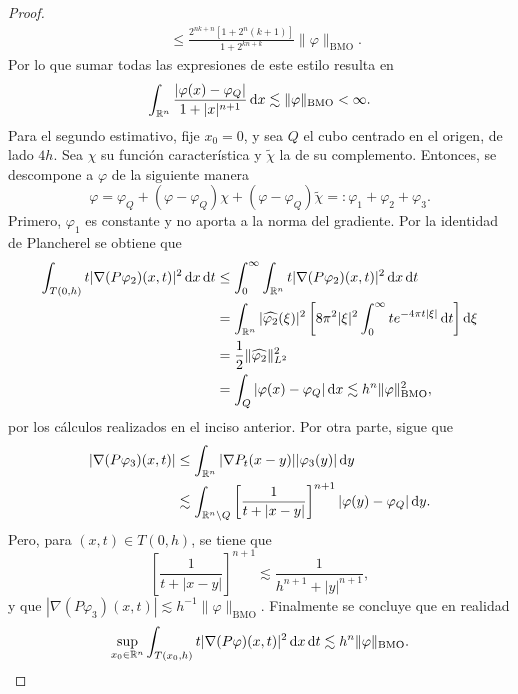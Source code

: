 \begin{proof}
\begin{align*}
		& \leq \frac{2^{nk+n} [1+2^n(k+1)]}{1+2^{kn+k}}\|\varphi\|_{\mathrm{BMO}}.
	\end{align*}
	Por lo que sumar todas las expresiones de este estilo resulta en 
	\begin{equation*}
		\int_{\mathbb{R}^n} \frac{|\varphi(x)-\varphi_Q|}{1+|x|^{n+1}} \mathop{}\!\mathrm{d} x \lesssim \|\varphi\|_{\mathrm{BMO}} < \infty.
	\end{equation*}
	Para el segundo estimativo, fije $x_0=0$, y sea $Q$ el cubo centrado en el origen, de lado $4h$. Sea $\chi$ su función característica y $\tilde{\chi}$ la de su complemento. Entonces, se descompone a $\varphi$ de la siguiente manera
	\begin{equation*}
		\varphi = \varphi_Q + (\varphi - \varphi_Q)\chi + (\varphi - \varphi_Q)\tilde{\chi} =: \varphi_1 + \varphi_2 + \varphi_3.
	\end{equation*}
	Primero, $\varphi_1$ es constante y no aporta a la norma del gradiente. Por la identidad de Plancherel se obtiene que 
	\begin{align*}
		\int_{T(0, h)} t|\nabla (P\varphi_2)(x, t)|^2 \mathop{}\!\mathrm{d} x \mathop{}\!\mathrm{d} t & \leq \int_0^\infty \int_{\mathbb{R}^{n}} t|\nabla (P\varphi_2)(x, t)|^2 \mathop{}\!\mathrm{d} x \mathop{}\!\mathrm{d} t  \\
		& = \int_{\mathbb{R}^n} |\widehat{\varphi_2}(\xi)|^2 \left[8\pi^2|\xi|^2 \int_0^\infty te^{-4\pi t|\xi|} \mathop{}\!\mathrm{d} t
		\right] \mathop{}\!\mathrm{d} \xi\\
		& = \frac{1}{2} \|\widehat{\varphi_2}\|_{L^2}^2 \\
		& = \int_Q |\varphi(x) - \varphi_Q| \mathop{}\!\mathrm{d} x \lesssim h^n \|\varphi\|_{\mathrm{BMO}}^2,
	\end{align*}
	por los cálculos realizados en el inciso anterior. Por otra parte, sigue que
	\begin{align*}
		|\nabla(P\varphi_3)(x, t)| & \leq \int_{\mathbb{R}^n} |\nabla P_t(x-y)||\varphi_3(y)|\mathop{}\!\mathrm{d} y \\
		& \lesssim \int_{\mathbb{R}^n\setminus Q} \left[ \frac{1}{t+|x-y|}
		\right]^{n+1} |\varphi(y) - \varphi_Q|\mathop{}\!\mathrm{d} y.
	\end{align*}
	Pero, para $(x, t) \in T(0, h)$, se tiene que
	\begin{equation*}
		\left[ \frac{1}{t+|x-y|}
		\right]^{n+1} \lesssim \frac{1}{h^{n+1} + |y|^{n+1}},
	\end{equation*}
	y que $|\nabla (P\varphi_3)(x, t)| \lesssim h^{-1}\|\varphi\|_{\mathrm{BMO}}$. Finalmente se concluye que en realidad
	\begin{equation*}
		\sup_{x_0\in\R^n}\int_{T(x_0, h)} t|\nabla (P\varphi)(x, t)|^2\diff x \diff t \lesssim h^n\|\varphi\|_{\mathrm{BMO}}.

\end{equation*}
\end{proof}
